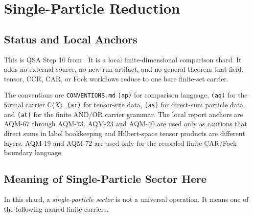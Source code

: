 
\section{Single-Particle Reduction}
\label{sec:qsa-single-particle-reduction}

\subsection{Status and Local Anchors}

This is QSA Step 10 from
.  It is a local
finite-dimensional comparison shard.  It adds no external source, no new run
artifact, and no general theorem that field, tensor, CCR, CAR, or Fock
workflows reduce to one bare finite-set carrier.

The conventions are \texttt{CONVENTIONS.md} \texttt{(ap)} for comparison
language, \texttt{(aq)} for the formal carrier \(\mathbb C\langle X\rangle\),
\texttt{(ar)} for tensor-site data, \texttt{(as)} for direct-sum particle
data, and \texttt{(at)} for the finite AND/OR carrier grammar.  The local
report anchors are AQM-67 through AQM-73.  AQM-23 and AQM-40 are used only as
cautions that direct sums in label bookkeeping and Hilbert-space tensor
products are different layers.  AQM-19 and AQM-72 are used only for the
recorded finite CAR/Fock boundary language.

\subsection{Meaning of Single-Particle Sector Here}

In this shard, a \emph{single-particle sector} is not a universal operation.
It means one of the following named finite carriers.

